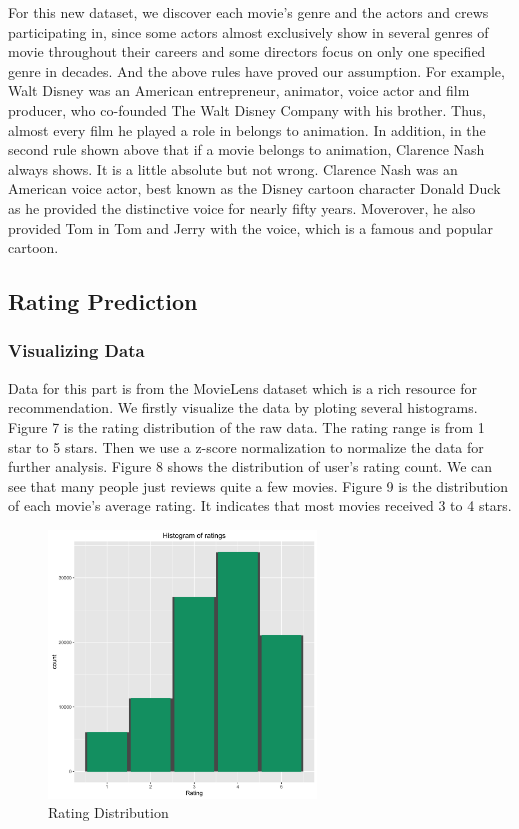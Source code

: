 \documentclass[conference]{IEEEtran}
\begin{document}
For this new dataset, we discover each movie’s genre and the actors and crews participating in, since some actors almost exclusively show in several genres of movie throughout their careers and some directors focus on only one specified genre in decades. And the above rules have proved our assumption. For example, Walt Disney was an American entrepreneur, animator, voice actor and film producer, who co-founded The Walt Disney Company with his brother. Thus, almost every film he played a role in belongs to animation. In addition, in the second rule shown above that if a movie belongs to animation, Clarence Nash always shows. It is a little absolute but not wrong. Clarence Nash was an American voice actor, best known as the Disney cartoon character Donald Duck as he provided the distinctive voice for nearly fifty years. Moverover, he also provided Tom in Tom and Jerry with the voice, which is a famous and popular cartoon.

\subsection{Rating Prediction}
\subsubsection{Visualizing Data}
Data for this part is from the MovieLens dataset which is a rich resource for recommendation. We firstly visualize the data by ploting several histograms. Figure 7 is the rating distribution of the raw data. The rating range is from 1 star to 5 stars. Then we use a z-score normalization to normalize the data for further analysis. Figure 8 shows the distribution of user's rating count. We can see that many people just reviews quite a few movies. Figure 9 is the distribution of each movie's average rating. It indicates that most movies received 3 to 4 stars.
\begin{figure}
	\centering
	\includegraphics[width=2.8in]{rating.png}
	\caption{Rating Distribution}
	\label{fig:side:a}
\end{figure}
\end{document}
